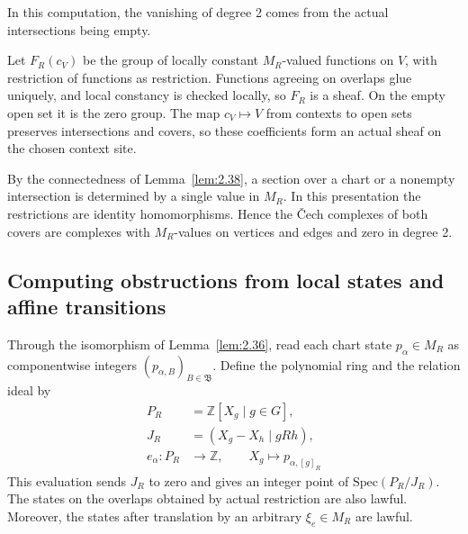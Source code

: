 In this computation, the vanishing of degree 2 comes from the actual intersections
being empty.

\begin{construction}\label{cons:2.39}

Let $F_R(c_V)$ be the group of locally constant $M_R$-valued functions on $V$, with
restriction of functions as restriction. Functions agreeing on overlaps glue uniquely,
and local constancy is checked locally, so $F_R$ is a sheaf. On the empty open set it is
the zero group. The map $c_V\mapsto V$ from contexts to open sets preserves intersections
and covers, so these coefficients form an actual sheaf on the chosen context site.

By the connectedness of Lemma~\ref{lem:2.38}, a section over a chart or a nonempty
intersection is determined by a single value in $M_R$. In this presentation the
restrictions are identity homomorphisms. Hence the \v{C}ech complexes of both covers are
complexes with $M_R$-values on vertices and edges and zero in degree 2.

\end{construction}

\subsection*{Computing obstructions from local states and affine transitions}

\begin{proposition}\label{prop:2.40}

Through the isomorphism of Lemma~\ref{lem:2.36}, read each chart state $p_\alpha\in M_R$
as componentwise integers $(p_{\alpha,B})_{B\in\mathfrak{B}}$. Define the polynomial ring
and the relation ideal by
\begin{equation*}
\begin{aligned}
P_R&=\mathbb{Z}[X_g\mid g\in G],\\
J_R&=(X_g-X_h\mid gRh),\\
e_\alpha:P_R&\longrightarrow\mathbb{Z},
\qquad X_g\longmapsto p_{\alpha,[g]_R}
\end{aligned}
\tag{2.25}\label{eq:2.25}
\end{equation*}
This evaluation sends $J_R$ to zero and gives an integer point of
$\mathrm{Spec}(P_R/J_R)$. The states on the overlaps obtained by actual restriction are
also lawful. Moreover, the states after translation by an arbitrary $\xi_e\in M_R$ are
lawful.

\end{proposition}

